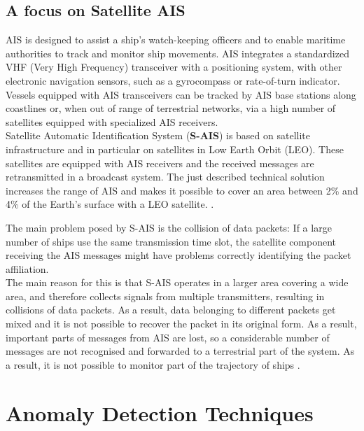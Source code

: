     \subsection{A focus on Satellite AIS}
    AIS is designed to assist a ship's watch-keeping officers and to enable maritime authorities to track and monitor ship movements. AIS integrates a standardized VHF (Very High Frequency) transceiver with a positioning system, with other electronic navigation sensors, such as a gyrocompass or rate-of-turn indicator. Vessels equipped with AIS transceivers can be tracked by AIS base stations along coastlines or, when out of range of terrestrial networks, via a high number of satellites equipped with specialized AIS receivers. 
    \\
    Satellite Automatic Identification System (\textbf{S-AIS}) is based on satellite infrastructure and in particular on satellites in Low Earth Orbit (LEO). These satellites are equipped with AIS receivers and the received messages are retransmitted in a broadcast system.
    The just described technical solution increases the range of AIS and makes it possible to cover an area between 2\% and 4\% of the Earth's surface with a LEO satellite. \cite{dbscan_ais}.
    
    The main problem posed by S-AIS is the collision of data packets: If a large number of ships use the same transmission time slot, the satellite component receiving the AIS messages might have problems correctly identifying the packet affiliation.
    \\
    The main reason for this is that S-AIS operates in a larger area covering a wide area, and therefore collects signals from multiple transmitters, resulting in collisions of data packets.
    As a result, data belonging to different packets get mixed and it is not possible to recover the packet in its original form. As a result, important parts of messages from AIS are lost, so a considerable number of messages are not recognised and forwarded to a terrestrial part of the system. As a result, it is not possible to monitor part of the trajectory of ships \cite{dbscan_ais}.
    
    
    
\clearpage  


\clearpage

\clearpage

\section{Anomaly Detection Techniques}
\label{sec:anomaly}

